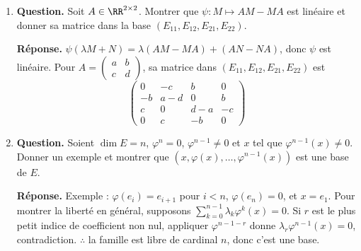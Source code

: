 \documentclass[12pt, a4paper]{article}
\begin{document}
\begin{enumerate}[label=7.\arabic*., start=68]
\begin{minipage}[t]{\linewidth}
\begin{enumerate}[\arabic*.]
  \item \textbf{Question.} $f_3:\RR{}[X]_{\leq3}\to\RR^3$, $P\mapsto(P(-1),P(0),P(1))$.
\par\smallskip
\textbf{Réponse.} Linéaire, de matrice $\begin{pmatrix}1&-1&1&-1\\1&0&0&0\\1&1&1&1\end{pmatrix}$ dans les bases canoniques.
        Son rang vaut $3$, son noyau est $\RR(X^3-X)$.
        Elle est surjective, mais n'est pas un isomorphisme.

  \item \textbf{Question.} $f_4:C^0(\RR,\RR)\to\RR$, $h\mapsto\int_0^1h(x)^2dx$.
\par\smallskip
\textbf{Réponse.} Non linéaire : pour la fonction constante $1$, $f_4(2)=4\neq2f_4(1)$.

\end{enumerate}
\end{minipage}

  \item \begin{minipage}[t]{\linewidth}\raggedright
\textbf{Question.} Soit $A\in\RR^{2\times2}$. Montrer que $\psi:M\mapsto AM-MA$ est linéaire et donner sa matrice dans la base $(E_{11},E_{12},E_{21},E_{22})$.
\par\smallskip
\textbf{Réponse.} $\psi(\lambda M+N)=\lambda(AM-MA)+(AN-NA)$, donc $\psi$ est linéaire.
    Pour $A=\begin{pmatrix}a&b\\c&d\end{pmatrix}$, sa matrice dans $(E_{11},E_{12},E_{21},E_{22})$ est
    \[
      \begin{pmatrix}0&-c&b&0\\-b&a-d&0&b\\c&0&d-a&-c\\0&c&-b&0\end{pmatrix}
    \]
\end{minipage}

  \item \begin{minipage}[t]{\linewidth}\raggedright
\textbf{Question.} Soient $\dim E=n$, $\varphi^n=0$, $\varphi^{n-1}\neq0$ et $x$ tel que $\varphi^{n-1}(x)\neq0$. Donner un exemple et montrer que $(x,\varphi(x),\ldots,\varphi^{n-1}(x))$ est une base de $E$.
\par\smallskip
\textbf{Réponse.} Exemple : $\varphi(e_i)=e_{i+1}$ pour $i<n$, $\varphi(e_n)=0$, et $x=e_1$.
    Pour montrer la liberté en général, supposons $\sum_{k=0}^{n-1}\lambda_k\varphi^k(x)=0$.
    Si $r$ est le plus petit indice de coefficient non nul, appliquer $\varphi^{n-1-r}$ donne
    $\lambda_r\varphi^{n-1}(x)=0$, contradiction.
    $\therefore$ la famille est libre de cardinal $n$, donc c'est une base.
\end{minipage}


\end{enumerate}
\end{document}
